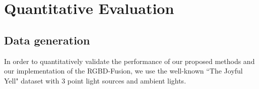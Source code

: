 \section{Quantitative Evaluation}


\subsection{Data generation}
In order to quantitatively validate the performance of our proposed methods and our implementation of the RGBD-Fusion, we use the well-known ``The Joyful Yell" dataset with 3 point light sources and ambient lights. 

